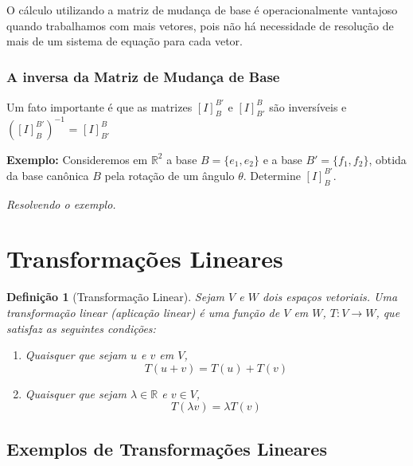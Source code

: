 \documentclass[oneside,a4paper,12pt]{article}
\newtheorem{definition}{Definição}[section]
\begin{document}
O cálculo utilizando a matriz de mudança de base é operacionalmente vantajoso quando trabalhamos com mais vetores, pois não há necessidade de resolução de mais de um sistema de equação para cada vetor.

\subsubsection{A inversa da Matriz de Mudança de Base} 
Um fato importante é que as matrizes $[I]_{B}^{B'}$ e $[I]_{B'}^{B}$ são inversíveis e
$([I]_{B}^{B'})^{-1}$ = $[I]_{B'}^{B}$

{\bf Exemplo: } Consideremos em $\mathbb{R}^2$ a base $B = \{ e_1, e_2 \}$ e a base $B' = \{ f_1, f_2 \}$, obtida da base canônica $B$ pela rotação de um ângulo $\theta$. Determine $[I]_{B}^{B'}$.

\vspace{50pt}
\emph{Resolvendo o exemplo.}

\newpage
\section{Transformações Lineares}

\begin{definition}[Transformação Linear]
	Sejam $V$ e $W$ dois espaços vetoriais. Uma \emph{transformação linear} (aplicação linear) é uma função de $V$ em $W$, $T : V \rightarrow W$, que satisfaz as seguintes condições:
	\begin{enumerate}
		\item Quaisquer que sejam $u$ e $v$ em $V$,
		$$T(u + v) = T(u) + T(v)$$
		\item Quaisquer que sejam $\lambda \in \mathbb{R}$ e $v \in V$,
		$$T(\lambda v) = \lambda T(v)$$
	\end{enumerate}
\end{definition}

\subsection{Exemplos de Transformações Lineares}
\end{document}
